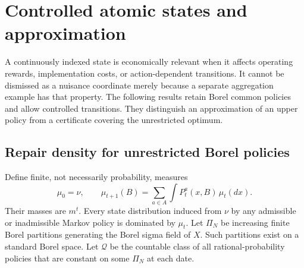 \section{Controlled atomic states and approximation}\label{sec:atomic45}
A continuously indexed state is economically relevant when it affects operating rewards, implementation costs, or action-dependent transitions. It cannot be dismissed as a nuisance coordinate merely because a separate aggregation example has that property. The following results retain Borel common policies and allow controlled transitions. They distinguish an approximation of an upper policy from a certificate covering the unrestricted optimum.

\subsection{Repair density for unrestricted Borel policies}\label{sec:density45}
Define finite, not necessarily probability, measures
\begin{equation}\label{eq:dominating45}
 \mu_0=\nu,\qquad \mu_{t+1}(B)=\sum_{a\in A}\int P_t^a(x,B)\,\mu_t(dx).
\end{equation}
Their masses are $m^t$. Every state distribution induced from $\nu$ by any admissible or inadmissible Markov policy is dominated by $\mu_t$. Let $\Pi_N$ be increasing finite Borel partitions generating the Borel sigma field of $X$. Such partitions exist on a standard Borel space. Let $\mathcal Q$ be the countable class of all rational-probability policies that are constant on some $\Pi_N$ at each date.

